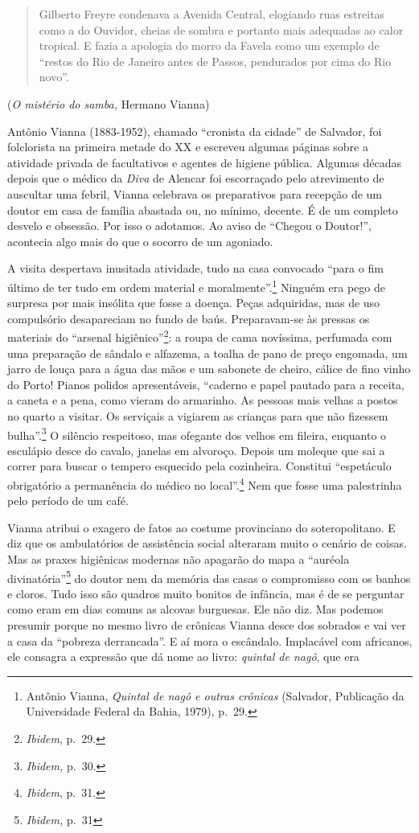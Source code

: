 \begin{quote}
Gilberto Freyre condenava a Avenida Central, elogiando ruas estreitas
como a do Ouvidor, cheias de sombra e portanto mais adequadas ao calor
tropical. E fazia a apologia do morro da Favela como um exemplo de
``restos do Rio de Janeiro antes de Passos, pendurados por cima do Rio
novo''.
\end{quote}

(\emph{O mistério do samba,} Hermano Vianna)

Antônio Vianna (1883-1952), chamado ``cronista da cidade'' de Salvador,
foi folclorista na primeira metade do XX e escreveu algumas páginas
sobre a atividade privada de facultativos e agentes de higiene pública.
Algumas décadas depois que o médico da \emph{Diva} de Alencar foi
escorraçado pelo atrevimento de auscultar uma febril, Vianna celebrava
os preparativos para recepção de um doutor em casa de família abastada
ou, no mínimo, decente. É de um completo desvelo e obsessão. Por isso o
adotamos. Ao aviso de ``Chegou o Doutor!'', acontecia algo mais do que o
socorro de um agoniado.

A visita despertava inusitada atividade, tudo na casa convocado ``para o
fim último de ter tudo em ordem material e moralmente''.\footnote{Antônio
  Vianna, \emph{Quintal de nagô e outras crônicas} (Salvador, Publicação
  da Universidade Federal da Bahia, 1979), p.~29.} Ninguém era pego de
surpresa por mais insólita que fosse a doença. Peças adquiridas, mas de
uso compulsório desapareciam no fundo de baús. Preparavam-se às pressas
os materiais do ``arsenal higiênico''\footnote{\emph{Ibidem}, p.~29.}: a
roupa de cama novíssima, perfumada com uma preparação de sândalo e
alfazema, a toalha de pano de preço engomada, um jarro de louça para a
água das mãos e um sabonete de cheiro, cálice de fino vinho do Porto!
Pianos polidos apresentáveis, ``caderno e papel pautado para a receita,
a caneta e a pena, como vieram do armarinho. As pessoas mais velhas a
postos no quarto a visitar. Os serviçais a vigiarem as crianças para que
não fizessem bulha''.\footnote{\emph{Ibidem,} p.~30.} O silêncio
respeitoso, mas ofegante dos velhos em fileira, enquanto o esculápio
desce do cavalo, janelas em alvoroço. Depois um moleque que sai a correr
para buscar o tempero esquecido pela cozinheira. Constitui ``espetáculo
obrigatório a permanência do médico no local''.\footnote{\emph{Ibidem},
  p.~31.} Nem que fosse uma palestrinha pelo período de um café.

Vianna atribui o exagero de fatos ao costume provinciano do
soteropolitano. E diz que os ambulatórios de assistência social
alteraram muito o cenário de coisas. Mas as praxes higiênicas modernas
não apagarão do mapa a ``auréola divinatória''\footnote{\emph{Ibidem,}
  p.~31} do doutor nem da memória das casas o compromisso com os banhos
e cloros. Tudo isso são quadros muito bonitos de infância, mas é de se
perguntar como eram em dias comuns as alcovas burguesas. Ele não diz.
Mas podemos presumir porque no mesmo livro de crônicas Vianna desce dos
sobrados e vai ver a casa da ``pobreza derrancada''. E aí mora o
escândalo. Implacável com africanos, ele consagra a expressão que dá
nome ao livro: \emph{quintal de nagô}, que era

